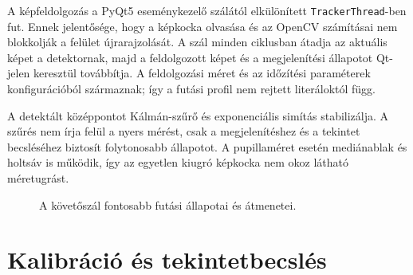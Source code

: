 \documentclass[12pt,a4paper,oneside]{book}
\begin{document}
A képfeldolgozás a PyQt5 eseménykezelő szálától elkülönített \texttt{TrackerThread}-ben fut. Ennek jelentősége, hogy a képkocka olvasása és az OpenCV számításai nem blokkolják a felület újrarajzolását. A szál minden ciklusban átadja az aktuális képet a detektornak, majd a feldolgozott képet és a megjelenítési állapotot Qt-jelen keresztül továbbítja. A feldolgozási méret és az időzítési paraméterek konfigurációból származnak; így a futási profil nem rejtett literáloktól függ.

A detektált középpontot Kálmán-szűrő és exponenciális simítás stabilizálja. A szűrés nem írja felül a nyers mérést, csak a megjelenítéshez és a tekintet becsléséhez biztosít folytonosabb állapotot. A pupillaméret esetén mediánablak és holtsáv is működik, így az egyetlen kiugró képkocka nem okoz látható méretugrást.

\begin{figure}[H]
    \centering
    \caption{A követőszál fontosabb futási állapotai és átmenetei.}
    \label{fig:tracker_states}
\end{figure}

\section{Kalibráció és tekintetbecslés}
\end{document}
